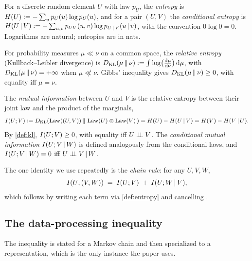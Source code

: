 \begin{definition}
\label{def:entropy}
For a discrete random element $U$ with law $p_U$, the \emph{entropy} is
$H(U) \vcentcolon= -\sum_{u} p_U(u)\log p_U(u)$, and for a pair $(U,V)$ the
\emph{conditional entropy} is
$H(U \,\vert\, V) \vcentcolon= -\sum_{u,v} p_{UV}(u,v)\log p_{U \,\vert\, V}(u\,\vert\, v)$,
with the convention $0\log 0 = 0$. Logarithms are natural; entropies are in
nats.
\end{definition}

\begin{definition}
\label{def:kl}
For probability measures $\mu \ll \nu$ on a common space, the
\emph{relative entropy} (Kullback--Leibler divergence) is
$D_{\mathrm{KL}}\!\left(\mu \,\Vert\, \nu\right) \vcentcolon= \int \log\!\big(\frac{\mathrm{d}\mu}{\mathrm{d}\nu}\big)\,\mathrm{d}\mu$,
with $D_{\mathrm{KL}}\!\left(\mu \,\Vert\, \nu\right) = +\infty$ when $\mu \not\ll \nu$. Gibbs' inequality gives
$D_{\mathrm{KL}}\!\left(\mu \,\Vert\, \nu\right) \ge 0$, with equality iff $\mu = \nu$.
\end{definition}

\begin{definition}
\label{def:mi}
The \emph{mutual information} between $U$ and $V$ is the relative entropy
between their joint law and the product of the marginals,
\[
  I(U ; V) \vcentcolon= D_{\mathrm{KL}}\!\left(\mathrm{Law}((U,V)) \,\Vert\, \,\mathrm{Law}(U)\otimes\mathrm{Law}(V)\,\right)
            = H(U) - H(U \,\vert\, V)
            = H(V) - H(V \,\vert\, U).
\]
By \cref{def:kl}, $I(U ; V) \ge 0$, with equality iff $U \perp\!\!\!\perp V$. The
\emph{conditional mutual information} $I(U ; V \,\vert\, W)$ is defined
analogously from the conditional laws, and $I(U ; V\,\vert\, W)=0$ iff
$U \perp\!\!\!\perp V \,\vert\, W$.
\end{definition}

The one identity we use repeatedly is the \emph{chain rule}: for any $U,V,W$,
\begin{equation}
  \label{eq:chainrule}
  I(U ; (V,W)) \;=\; I(U ; V) \;+\; I(U ; W \,\vert\, V),
\end{equation}
which follows by writing each term via \cref{def:entropy} and cancelling
\citep[Thm.~2.5.2]{coverthomas2006}.

\subsection{The data-processing inequality}
\label{subsec:dpi}

The inequality is stated for a Markov chain and then specialized to a
representation, which is the only instance the paper uses.

